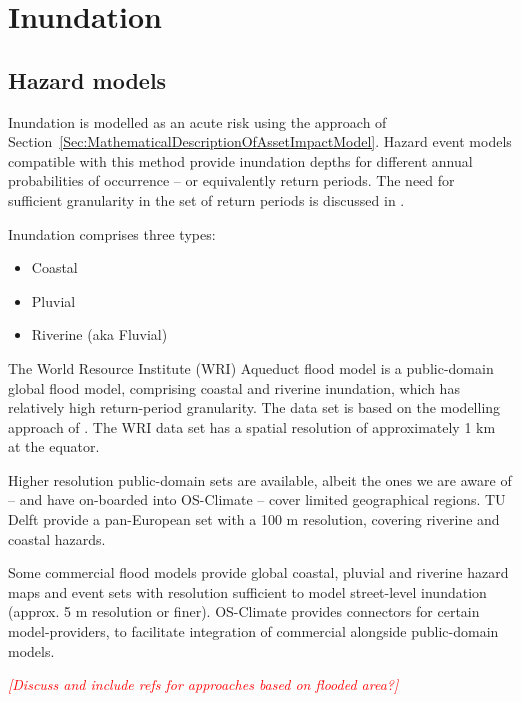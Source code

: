\documentclass[a4paper,11pt]{extarticle} %
\theoremstyle{definition}
\begin{document}

\section{Inundation}
\subsection{Hazard models}
Inundation is modelled as an acute risk using the approach of Section~\ref{Sec:MathematicalDescriptionOfAssetImpactModel}. Hazard event models compatible with this method provide inundation depths for different annual probabilities of occurrence -- or equivalently return periods. The need for sufficient granularity in the set of return periods is discussed in \cite{WardEtAl:2011}.

Inundation comprises three types:
\begin{itemize}
\item Coastal
\item Pluvial
\item Riverine (aka Fluvial)
\end{itemize}

The World Resource Institute (WRI) Aqueduct flood model \cite{WardEtAl:2020} is a public-domain global flood model, comprising coastal and riverine inundation, which has relatively high return-period granularity. The data set is based on the modelling approach of \cite{WardEtAl:2013}. The WRI data set has a spatial resolution of approximately 1 km at the equator.

Higher resolution public-domain sets are available, albeit the ones we are aware of -- and have on-boarded into OS-Climate -- cover limited geographical regions. TU Delft provide a pan-European set \cite{PaprotnyEtAl:2016} with a 100 m resolution, covering riverine and coastal hazards.

Some commercial flood models provide global coastal, pluvial and riverine hazard maps and event sets with resolution sufficient to model street-level inundation (approx. 5 m resolution or finer). OS-Climate provides connectors for certain model-providers, to facilitate integration of commercial alongside public-domain models.

{\textcolor{red}{\emph{[Discuss and include refs for approaches based on flooded area?]}}}
\end{document}
